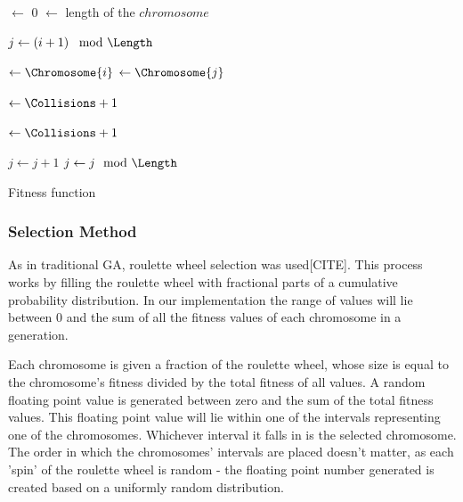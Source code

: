 \documentclass{sig-alternate}
\begin{document}
\begin{algorithm}[t!]
  \SetAlgoLined
  \DontPrintSemicolon
  
  {
    \BlankLine
    
    \Collisions $\leftarrow$ 0\;
    \Length $\leftarrow$ length of the $chromosome$\;
    \BlankLine
    
    {
      $j \leftarrow \left( i + 1 \right) \mod{\Length}$\;
      {
        \Yi $\leftarrow \Chromosome{i}$\;
        \Yj $\leftarrow \Chromosome{j}$\;
        \BlankLine
        
        \If{\Yi == \Yj}
        {
          \Collisions $\leftarrow \Collisions + 1$\; 
        }
        \BlankLine
        
        {
          \Collisions $\leftarrow \Collisions + 1$\;
        }
        \BlankLine
        
        $j \leftarrow j + 1$\;
        $j \leftarrow j \mod{\Length}$\;
      }
    }
    \BlankLine

    {
      \;
    }
    {
      \;
    }
  }
\caption{Fitness function}
\label{alg:fitness}
\end{algorithm}

\subsubsection{Selection Method}
As in traditional GA, roulette wheel selection was used[CITE]. This process works by filling the roulette wheel with fractional parts of a cumulative probability distribution. In our implementation the range of values will lie between 0 and the sum of all the fitness values of each chromosome in a generation.

Each chromosome is given a fraction of the roulette wheel, whose size is equal to the chromosome's fitness divided by the total fitness of all values. A random floating point value is generated between zero and the sum of the total fitness values. This floating point value will lie within one of the intervals representing one of the chromosomes. Whichever interval it falls in is the selected chromosome. The order in which the chromosomes' intervals are placed doesn't matter, as each 'spin' of the roulette wheel is random - the floating point number generated is created based on a uniformly random distribution.
\end{document}
